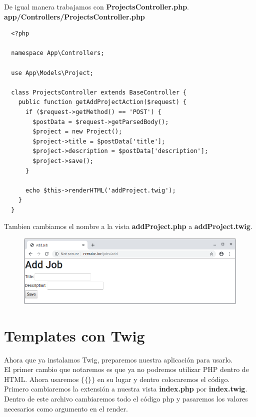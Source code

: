 \documentclass{article}
\begin{document}
De igual manera trabajamos con \textbf{ProjectsController.php}.\\

\textbf{app/Controllers/ProjectsController.php}
\begin{verbatim}
  <?php

  namespace App\Controllers;

  use App\Models\Project;

  class ProjectsController extends BaseController {
    public function getAddProjectAction($request) {
      if ($request->getMethod() == 'POST') {
        $postData = $request->getParsedBody();
        $project = new Project();
        $project->title = $postData['title'];
        $project->description = $postData['description'];
        $project->save();
      }

      echo $this->renderHTML('addProject.twig');
    }
  }
\end{verbatim}

Tambien cambiamos el nombre a la vista \textbf{addProject.php} a
\textbf{addProject.twig}.\\

\newpage

\begin{figure}[h!]
  \centering
  \includegraphics[scale=0.5]{./Pictures/155_twig_projectsadd_ok.png}
\end{figure}

\newpage

\section{Templates con Twig}%
Ahora que ya instalamos Twig, preparemos nuestra aplicación para usarlo.\\

El primer cambio que notaremos es que ya no podremos utilizar PHP dentro de
HTML. Ahora usaremos $\{\{\}\}$ en su lugar y dentro colocaremos el código.\\

Primero cambiaremos la extensión a nuestra vista \textbf{index.php} por
\textbf{index.twig}. Dentro de este archivo cambiaremos todo el código php y
pasaremos los valores necesarios como argumento en el render.\\
\end{document}
